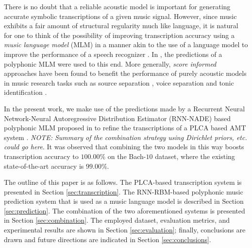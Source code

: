 There is no doubt that a reliable acoustic model is important for generating accurate symbolic transcriptions of a given music signal. However, since music exhibits a fair amount of structural regularity much like language, it is natural for one to think of the possibility of improving transcription accuracy using a \textit{music language model} (MLM) in a manner akin to the use of a language model to improve the performance of a speech recognizer \cite{Rabiner1993}. In \cite{Boulanger-Lewandowski2012}, the predictions of a polyphonic MLM were used to this end. More generally, \textit{score informed} approaches have been found to benefit the performance of purely acoustic models in music research tasks such as source separation \cite{Ewert2012}, voice separation \cite{Ewert2011} and tonic identification \cite{Senturk2013}. %

In the present work, we make use of the predictions made by a Recurrent Neural Network-Neural Autoregressive Distribution Estimator (RNN-NADE) based polyphonic MLM proposed in \cite{Boulanger-Lewandowski2012} to refine the transcriptions of a PLCA based AMT system \cite{Benetos2012, Benetos2013}. \textit{NOTE: Summary of the combination strategy using Dirichlet priors, etc. could go here}. It was observed that combining the two models in this way boosts transcription accuracy to $100.00\%$ on the Bach-$10$ dataset, where the existing state-of-the-art accuracy is $99.00\%$.

The outline of this paper is as follows. The PLCA-based transcription system is presented in Section \ref{sec:transcription}. The RNN-RBM-based polyphonic music prediction system that is used as a music language model is described in Section \ref{sec:prediction}. The combination of the two aforementioned systems is presented in Section \ref{sec:combination}. The employed dataset, evaluation metrics, and experimental results are shown in Section \ref{sec:evaluation}; finally, conclusions are drawn and future directions are indicated in Section \ref{sec:conclusions}.